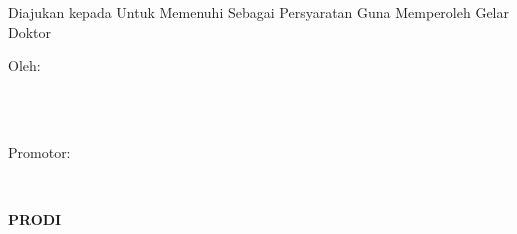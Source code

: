 
\newpage
{}
\begin{center}
    \begin{doublespace}
        \textbf{\large{\MakeUppercase{\judulid}}}\\[2.5cm]
    \end{doublespace}

    \textbf{\MakeUppercase{\large{\tipe}}}\\[0.5cm]
    \begin{onehalfspace}
        Diajukan kepada {\fakultas} {\universitas} Untuk Memenuhi Sebagai Persyaratan Guna Memperoleh Gelar Doktor\\[1.8cm]
    \end{onehalfspace}

    \large Oleh: \\
    \begin{onehalfspace}
        \large{\penulis} \\
        \large{\nim}\\[1.5cm]
    \end{onehalfspace}
    \vspace{1.5cm}

    \large Promotor: \\
    \begin{onehalfspace}
        \large{\pembimbing} \\
    \end{onehalfspace}

    \vfill

    \textbf{\large \MakeUppercase{Prodi \prodi}}\\
    \textbf{\large \MakeUppercase{\fakultas}}\\
    \textbf{\large \MakeUppercase{\universitas}}\\
    \textbf{\large \the\year{}}\\
\end{center}
